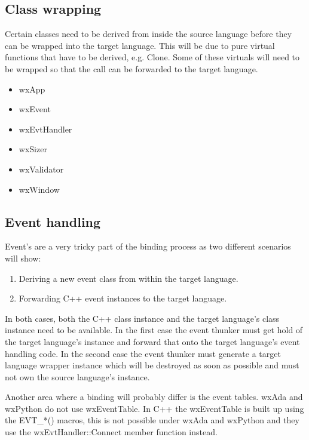 \subsection{Class wrapping}\label{classwrapping}

Certain classes need to be derived from inside the source language before they can be wrapped into the target language. This will be
due to pure virtual functions that have to be derived, e.g. Clone. Some of these virtuals will need to be wrapped so that the call can be
forwarded to the target language.

\begin{itemize}\itemsep=0pt
\item wxApp
\item wxEvent
\item wxEvtHandler
\item wxSizer
\item wxValidator
\item wxWindow
\end{itemize}

\subsection{Event handling}\label{eventhandling}

Event's are a very tricky part of the binding process as two different scenarios will show:

\begin{enumerate}\itemsep=0pt
\item Deriving a new event class from within the target language.
\item Forwarding C++ event instances to the target language.
\end{enumerate}

In both cases, both the C++ class instance and the target language's class instance need to be available. In the first case the event
thunker must get hold of the target language's instance and forward that onto the target language's event handling code. In the second
case the event thunker must generate a target language wrapper instance which will be destroyed as soon as possible and must not own the
source language's instance.

Another area where a binding will probably differ is the event tables. wxAda and wxPython do not use wxEventTable. In C++ the wxEventTable
is built up using the EVT_*() macros, this is not possible under wxAda and wxPython and they use the wxEvtHandler::Connect member function
instead.

